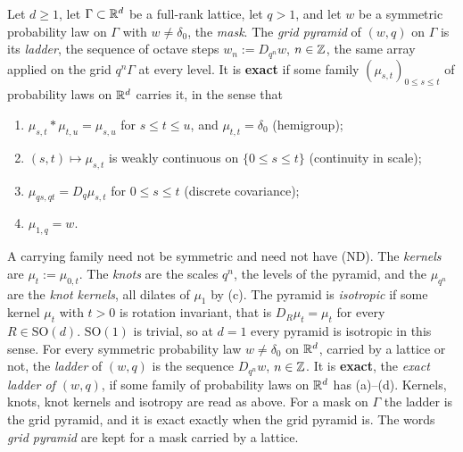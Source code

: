 \begin{definition}
\label{def:exact-grid-pyramid}

Let $d \ge 1$, let $\Gamma \subset \mathbb{R}^d$ be a full-rank lattice, let $q > 1$, and let $w$ be a
symmetric probability law on $\Gamma$ with $w \ne \delta_0$, the \emph{mask}. The
\emph{grid pyramid} of $(w, q)$ on $\Gamma$ is its \emph{ladder}, the sequence of octave steps
$w_n := D_{q^n}w$, $n \in \mathbb{Z}$, the same array applied on the grid $q^n\Gamma$ at every level. It is
\textbf{exact} if some family $(\mu_{s,t})_{0 \le s \le t}$ of probability laws on $\mathbb{R}^d$ carries
it, in the sense that
\begin{enumerate}
\item[(a)] $\mu_{s,t} * \mu_{t,u} = \mu_{s,u}$ for $s \le t \le u$, and $\mu_{t,t} = \delta_0$
(hemigroup);
\item[(b)] $(s,t) \mapsto \mu_{s,t}$ is weakly continuous on $\{0 \le s \le t\}$ (continuity in
scale);
\item[(c)] $\mu_{qs,qt} = D_q\mu_{s,t}$ for $0 \le s \le t$ (discrete covariance);
\item[(d)] $\mu_{1,q} = w$.
\end{enumerate}
A carrying family need not be symmetric and need not have (ND). The \emph{kernels} are $\mu_t := \mu_{0,t}$. The \emph{knots} are the scales $q^n$, the levels of
the pyramid, and the $\mu_{q^n}$ are the \emph{knot kernels}, all dilates of $\mu_1$ by (c). The
pyramid is \emph{isotropic} if some kernel $\mu_t$ with $t > 0$ is rotation invariant, that is
$D_R\mu_t = \mu_t$ for every $R \in \mathrm{SO}(d)$. $\mathrm{SO}(1)$ is trivial, so at $d = 1$ every pyramid
is isotropic in this sense.
For every symmetric probability law $w \ne \delta_0$ on $\mathbb{R}^d$, carried by a lattice or not, the
\emph{ladder} of $(w, q)$ is the sequence $D_{q^n}w$, $n \in \mathbb{Z}$. It is \textbf{exact}, the
\emph{exact ladder of $(w, q)$}, if some family of probability laws on $\mathbb{R}^d$ has (a)--(d).
Kernels, knots, knot kernels and isotropy are read as above. For a mask on $\Gamma$ the ladder is
the grid pyramid, and it is exact exactly when the grid pyramid is. The words \emph{grid pyramid}
are kept for a mask carried by a lattice.
\end{definition}

